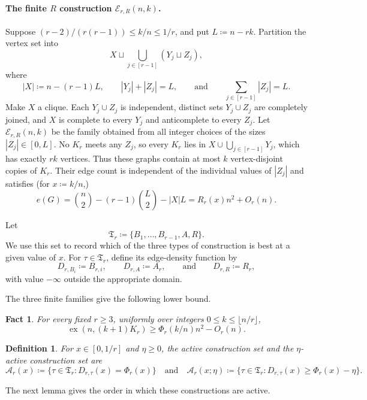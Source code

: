 \documentclass[10pt]{article}
\numberwithin{equation}{section}
\newtheorem{fact}[fact]{Fact}
\newtheorem{definition}[definition]{Definition}
\newcommand{\ex}{\operatorname{ex}}
\newcommand{\cA}{\mathcal A}
\newcommand{\cE}{\mathcal E}
\begin{document}
\paragraph{The finite $R$ construction $\cE_{r,R}(n,k)$.}
Suppose $(r-2)/(r(r-1))\le k/n\le1/r$, and put $L\coloneqq n-rk$.  Partition the vertex set into
\[
 X\sqcup\bigcup_{j\in[r-1]}(Y_j\sqcup Z_j),
\]
where
\[
 |X|\coloneqq n-(r-1)L,\qquad |Y_j|+|Z_j|=L,\qquad\text{and}\qquad \sum_{j\in[r-1]}|Z_j|=L.
\]
Make $X$ a clique.  Each $Y_j\cup Z_j$ is independent, distinct sets $Y_j\cup Z_j$ are completely joined, and $X$ is complete to every $Y_j$ and anticomplete to every $Z_j$.  Let $\cE_{r,R}(n,k)$ be the family obtained from all integer choices of the sizes $|Z_j|\in[0,L]$.  No $K_r$ meets any $Z_j$, so every $K_r$ lies in $X\cup\bigcup_{j\in[r-1]}Y_j$, 
which has exactly $rk$ vertices.  Thus these graphs contain at most $k$ vertex-disjoint copies of $K_r$.  Their edge count is independent of the individual values of $|Z_j|$ and satisfies (for $x\coloneqq k/n$,)
\begin{equation}\label{eq:finite-R-count}
 e(G)=\binom n2-(r-1)\binom L2-|X|L
 =R_r(x)n^2+O_r(n).
\end{equation}

Let
\[
 \mathfrak T_r\coloneqq\{B_1,\ldots,B_{r-1},A,R\}.
\]
We use this set to record which of the three types of construction is best at a given value of $x$.
For $\tau\in\mathfrak T_r$, define its edge-density function by
\[
 D_{r,B_i}\coloneqq B_{r,i},\qquad D_{r,A}\coloneqq A_r,\qquad\text{and}\qquad D_{r,R}\coloneqq R_r,
\]
with value $-\infty$ outside the appropriate domain.

The three finite families give the following lower bound.

\begin{fact}\label{prop:finite-lower-bound}
For every fixed $r\ge3$, uniformly over integers $0\le k\le\lfloor n/r\rfloor$,
\[
 \ex(n,(k+1)K_r)\ge \Phi_r(k/n)n^2-O_r(n).
\]
\end{fact}

\begin{definition}\label{def:active-family}
For $x\in[0,1/r]$ and $\eta\ge0$, the \emph{active construction set} and the \emph{$\eta$-active construction set} are
\[
 \cA_r(x)\coloneqq\{\tau\in\mathfrak T_r\colon D_{r,\tau}(x)=\Phi_r(x)\}
 \quad\text{and}\quad 
 \cA_r(x;\eta)\coloneqq\{\tau\in\mathfrak T_r\colon D_{r,\tau}(x)\ge \Phi_r(x)-\eta\}.
\]
\end{definition}

The next lemma gives the order in which these constructions are active.
\end{document}
